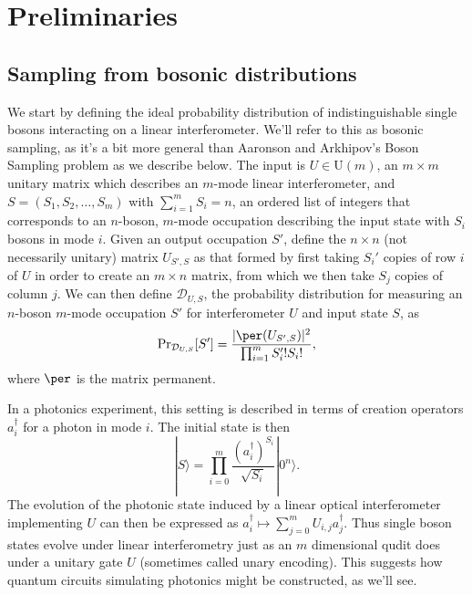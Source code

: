 \section{Preliminaries}
\label{sec:preliminary-notes}

\subsection{Sampling from bosonic distributions}

We start by defining the ideal probability distribution of indistinguishable single bosons interacting on a linear interferometer.
We'll refer to this as bosonic sampling, as it's a bit more general than Aaronson and Arkhipov's Boson Sampling problem as we describe below.
The input is $U \in \mathrm{U}(m)$, an $m\times m$ unitary matrix which describes an $m$-mode linear interferometer, and $S = (S_1,S_2,\dots,S_m)$ with $\sum_{i=1}^m S_i =n$, an ordered list of integers that corresponds to an $n$-boson, $m$-mode occupation describing the input state with $S_i$ bosons in mode $i$. 
Given an output occupation $S'$, define the $n \times n$ (not necessarily unitary) matrix $U_{S',S}$ as that formed by first taking $S_i'$ copies of row $i$ of $U$ in order to create an $m\times n$ matrix, from which we then take $S_j$ copies of column $j$. 
We can then define $\mathcal{D}_{U,S}$, the probability distribution for measuring an $n$-boson $m$-mode occupation $S'$ for interferometer $U$ and input state $S$, as
\begin{equation}\label{eqn:bs-distribution}
\textrm{Pr}_{\mathcal{D}_{U,S}}[S'] = \frac{|\per(U_{S',S})|^2}{\prod_{i=1}^m S_i'! S_i!} ,
\end{equation}
where $\per$ is the matrix permanent.

In a photonics experiment, this setting is described in terms of creation operators $a^\dag_i$ for a photon in mode $i$. 
The initial state is then
\begin{equation}
|S\rangle = \prod_{i=0}^m \frac{(a_i^\dagger)^{S_i}}{\sqrt{S_i}}|0^n\rangle.
\end{equation}
The evolution of the photonic state induced by a linear optical interferometer implementing $U$ can then be expressed as $a_i^\dagger \mapsto \sum_{j = 0}^m U_{i,j}a_j^\dagger$.
Thus single boson states evolve under linear interferometry just as an $m$ dimensional qudit does under a unitary gate $U$ (sometimes called unary encoding).
This suggests how quantum circuits simulating photonics might be constructed, as we'll see.

